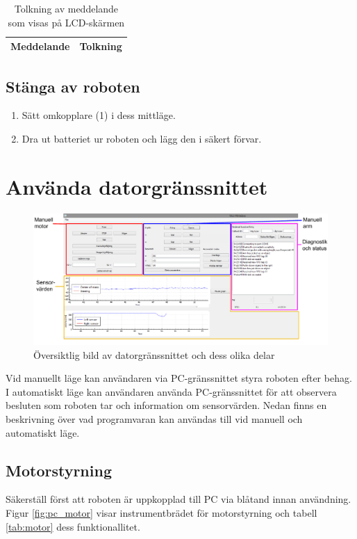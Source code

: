 \documentclass[a4paper,12pt]{article}
\begin{document}
\begin{table}[H]
\centering
    \begin{tabularx}{\textwidth}{|l|X|}
        \hline \textbf{Meddelande} & \textbf{Tolkning} \\ \hline
    \end{tabularx}
\caption{Tolkning av meddelande som visas på LCD-skärmen}
\label{tab:lcd}
\end{table}

\subsection{Stänga av roboten}
\begin{enumerate}
\item Sätt omkopplare (1) i dess mittläge.
\item Dra ut batteriet ur roboten och lägg den i säkert förvar.
\end{enumerate}
%
%
\section{Använda datorgränssnittet}

\begin{figure}[H]
	\centering
	\includegraphics[width=1.0\textwidth]{PC_manual.pdf}
	\caption{Översiktlig bild av datorgränssnittet och dess olika delar}
	\label{fig:pc_oversikt}
\end{figure}

Vid manuellt läge kan användaren via PC-gränssnittet styra roboten efter behag. I automatiskt läge kan användaren använda PC-gränssnittet för att observera besluten som roboten tar och information om sensorvärden. Nedan finns en beskrivning över vad programvaran kan användas till vid manuell och automatiskt läge. 

\subsection{Motorstyrning}
\label{subsec:motor}
Säkerställ först att roboten är uppkopplad till PC via blåtand innan användning. Figur \ref{fig:pc_motor} visar instrumentbrädet för motorstyrning och tabell \ref{tab:motor} dess funktionallitet.
\end{document}
